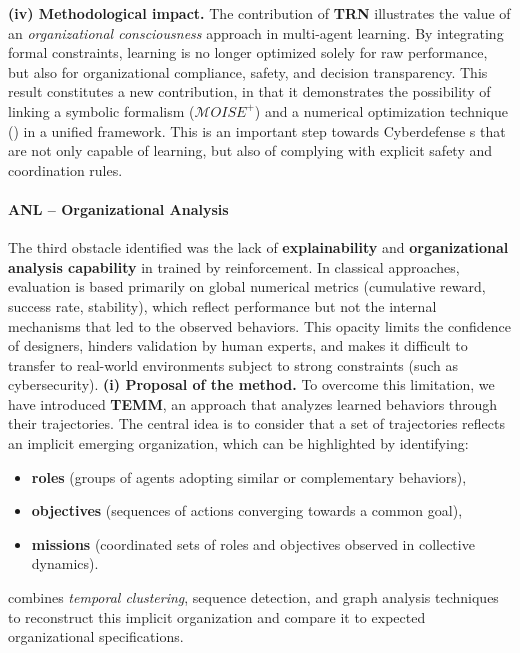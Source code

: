 \medskip
\noindent
\textbf{(iv) Methodological impact.}
The contribution of \textbf{TRN} illustrates the value of an \textit{organizational consciousness} approach in multi-agent learning.
By integrating formal constraints, learning is no longer optimized solely for raw performance, but also for organizational compliance, safety, and decision transparency.
This result constitutes a new contribution, in that it demonstrates the possibility of linking a symbolic formalism ($\mathcal{M}OISE^+$) and a numerical optimization technique () in a unified framework.
This is an important step towards Cyberdefense s that are not only capable of learning, but also of complying with explicit safety and coordination rules.
\paragraph{ANL – Organizational Analysis}
The third obstacle identified was the lack of \textbf{explainability} and \textbf{organizational analysis capability} in  trained by reinforcement.
In classical  approaches, evaluation is based primarily on global numerical metrics (cumulative reward, success rate, stability), which reflect performance but not the internal mechanisms that led to the observed behaviors.
This opacity limits the confidence of designers, hinders validation by human experts, and makes it difficult to transfer to real-world environments subject to strong constraints (such as cybersecurity).
\medskip
\noindent
\textbf{(i) Proposal of the  method.}
To overcome this limitation, we have introduced \textbf{TEMM}, an approach that analyzes learned behaviors through their trajectories.
The central idea is to consider that a set of trajectories reflects an implicit emerging organization, which can be highlighted by identifying:
\begin{itemize}

  \item \textbf{roles} (groups of agents adopting similar or complementary behaviors),
  \item \textbf{objectives} (sequences of actions converging towards a common goal),
  \item \textbf{missions} (coordinated sets of roles and objectives observed in collective dynamics).
\end{itemize}
 combines \textit{temporal clustering}, sequence detection, and graph analysis techniques to reconstruct this implicit organization and compare it to expected organizational specifications.
